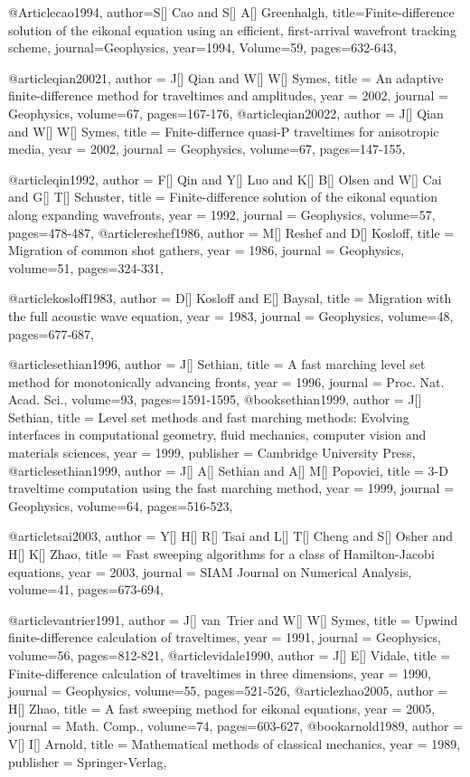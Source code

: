 {@Article{cao1994,
  author={S[] Cao and S[] A[] Greenhalgh},
  title={Finite-difference solution of the eikonal equation using an efficient, first-arrival wavefront tracking scheme},
  journal={Geophysics},
  year=1994,
  Volume=59,
  pages={632-643},
}

@article{qian20021,
  author =	 {J[] Qian and W[] W[] Symes},
  title =	 {An adaptive finite-difference method for traveltimes and amplitudes},
  year =	 2002,
  journal =	 {Geophysics},
  volume={67},
 pages=167-176,
}
@article{qian20022,
  author =	 {J[] Qian and W[] W[] Symes},
  title =	 {Fnite-differnce quasi-P traveltimes for anisotropic media},
  year =	 2002,
  journal =	 {Geophysics},
  volume={67},
 pages=147-155,
}

@article{qin1992,
  author =	 {F[] Qin and Y[] Luo and K[] B[] Olsen and W[] Cai and G[] T[] Schuster},
  title =	 {Finite-difference solution of the eikonal equation along expanding wavefronts},
  year =	 1992,
  journal =	 {Geophysics},
  volume={57},
 pages=478-487,
}
@article{reshef1986,
  author =	 {M[] Reshef and D[] Kosloff},
  title =	 {Migration of common shot gathers},
  year =	 1986,
  journal =	 {Geophysics},
  volume={51},
 pages=324-331,
}

@article{kosloff1983,
  author =	 {D[] Kosloff and E[] Baysal},
  title =	 {Migration with the full acoustic wave equation},
  year =	 1983,
  journal =	 {Geophysics},
  volume={48},
 pages=677-687,
}

@article{sethian1996,
  author =	 {J[] Sethian},
  title =	 {A fast marching level set method for monotonically advancing fronts},
  year =	 1996,
  journal =	 {Proc. Nat. Acad. Sci.},
  volume={93},
 pages=1591-1595,
}
@book{sethian1999,
  author =	 {J[] Sethian},
  title =	 {Level set methods and fast marching methods: Evolving interfaces in computational geometry, fluid mechanics, computer vision and materials sciences},
  year =	 1999,
  publisher =	 {Cambridge University Press},
}
@article{sethian1999,
  author =	 {J[] A[] Sethian and A[] M[] Popovici},
  title =	 {3-D traveltime computation using the fast marching method},
  year =	 1999,
  journal =	 {Geophysics},
  volume={64},
 pages=516-523,
}

@article{tsai2003,
  author =	 {Y[] H[] R[] Tsai and L[] T[] Cheng and S[] Osher and H[] K[] Zhao},
  title =	 {Fast sweeping algorithms for a class of Hamilton-Jacobi equations},
  year =	 2003,
  journal =	 {SIAM Journal on Numerical Analysis},
  volume={41},
 pages=673-694,
}

@article{vantrier1991,
  author =	 {J[] van~Trier and W[] W[] Symes},
  title =	 {Upwind finite-difference calculation of traveltimes},
  year =	 1991,
  journal =	 {Geophysics},
  volume={56},
 pages=812-821,
}
@article{vidale1990,
  author =	 {J[] E[] Vidale},
  title =	 {Finite-difference calculation of traveltimes in three dimensions},
  year =	 1990,
  journal =	 {Geophysics},
  volume={55},
 pages=521-526,
}
@article{zhao2005,
  author =	 {H[] Zhao},
  title =	 {A fast sweeping method for eikonal equations},
  year =	 2005,
  journal =	 {Math. Comp.},
  volume={74},
 pages=603-627,
}
@book{arnold1989,
  author =	 {V[] I[] Arnold},
  title =	 {Mathematical methods of classical mechanics},
  year =	 1989,
  publisher =	 {Springer-Verlag},
}

}
